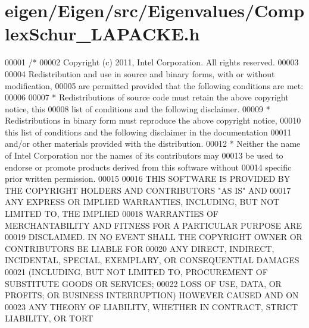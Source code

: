 \hypertarget{eigen_2_eigen_2src_2_eigenvalues_2_complex_schur___l_a_p_a_c_k_e_8h_source}{}\section{eigen/\+Eigen/src/\+Eigenvalues/\+Complex\+Schur\+\_\+\+L\+A\+P\+A\+C\+KE.h}
\label{eigen_2_eigen_2src_2_eigenvalues_2_complex_schur___l_a_p_a_c_k_e_8h_source}

\begin{DoxyCode}
00001 \textcolor{comment}{/*}
00002 \textcolor{comment}{ Copyright (c) 2011, Intel Corporation. All rights reserved.}
00003 \textcolor{comment}{}
00004 \textcolor{comment}{ Redistribution and use in source and binary forms, with or without modification,}
00005 \textcolor{comment}{ are permitted provided that the following conditions are met:}
00006 \textcolor{comment}{}
00007 \textcolor{comment}{ * Redistributions of source code must retain the above copyright notice, this}
00008 \textcolor{comment}{   list of conditions and the following disclaimer.}
00009 \textcolor{comment}{ * Redistributions in binary form must reproduce the above copyright notice,}
00010 \textcolor{comment}{   this list of conditions and the following disclaimer in the documentation}
00011 \textcolor{comment}{   and/or other materials provided with the distribution.}
00012 \textcolor{comment}{ * Neither the name of Intel Corporation nor the names of its contributors may}
00013 \textcolor{comment}{   be used to endorse or promote products derived from this software without}
00014 \textcolor{comment}{   specific prior written permission.}
00015 \textcolor{comment}{}
00016 \textcolor{comment}{ THIS SOFTWARE IS PROVIDED BY THE COPYRIGHT HOLDERS AND CONTRIBUTORS "AS IS" AND}
00017 \textcolor{comment}{ ANY EXPRESS OR IMPLIED WARRANTIES, INCLUDING, BUT NOT LIMITED TO, THE IMPLIED}
00018 \textcolor{comment}{ WARRANTIES OF MERCHANTABILITY AND FITNESS FOR A PARTICULAR PURPOSE ARE}
00019 \textcolor{comment}{ DISCLAIMED. IN NO EVENT SHALL THE COPYRIGHT OWNER OR CONTRIBUTORS BE LIABLE FOR}
00020 \textcolor{comment}{ ANY DIRECT, INDIRECT, INCIDENTAL, SPECIAL, EXEMPLARY, OR CONSEQUENTIAL DAMAGES}
00021 \textcolor{comment}{ (INCLUDING, BUT NOT LIMITED TO, PROCUREMENT OF SUBSTITUTE GOODS OR SERVICES;}
00022 \textcolor{comment}{ LOSS OF USE, DATA, OR PROFITS; OR BUSINESS INTERRUPTION) HOWEVER CAUSED AND ON}
00023 \textcolor{comment}{ ANY THEORY OF LIABILITY, WHETHER IN CONTRACT, STRICT LIABILITY, OR TORT}

\end{DoxyCode}
